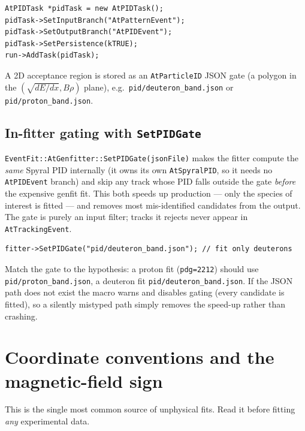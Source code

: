 \documentclass[11pt,a4paper]{article}
\newcommand{\code}[1]{\texttt{\small #1}}
\newcommand{\file}[1]{\texttt{\small #1}}
\begin{document}
\begin{lstlisting}
AtPIDTask *pidTask = new AtPIDTask();
pidTask->SetInputBranch("AtPatternEvent");
pidTask->SetOutputBranch("AtPIDEvent");
pidTask->SetPersistence(kTRUE);
run->AddTask(pidTask);
\end{lstlisting}

A 2D acceptance region is stored as an \code{AtParticleID} JSON gate (a polygon in
the $(\sqrt{dE/dx}, B\rho)$ plane), e.g.\ \file{pid/deuteron\_band.json} or
\file{pid/proton\_band.json}.

\subsection{In-fitter gating with \texttt{SetPIDGate}}

\code{EventFit::AtGenfitter::SetPIDGate(jsonFile)} makes the fitter compute the
\emph{same} Spyral PID internally (it owns its own \code{AtSpyralPID}, so it needs
no \code{AtPIDEvent} branch) and skip any track whose PID falls outside the gate
\emph{before} the expensive genfit fit. This both speeds up production --- only
the species of interest is fitted --- and removes most mis-identified candidates
from the output. The gate is purely an input filter; tracks it rejects never
appear in \code{AtTrackingEvent}.

\begin{lstlisting}
fitter->SetPIDGate("pid/deuteron_band.json"); // fit only deuterons
\end{lstlisting}

\begin{notebox}
Match the gate to the hypothesis: a proton fit (\code{pdg=2212}) should use
\code{pid/proton\_band.json}, a deuteron fit \code{pid/deuteron\_band.json}. If the
JSON path does not exist the macro warns and disables gating (every candidate is
fitted), so a silently mistyped path simply removes the speed-up rather than
crashing.
\end{notebox}

\section{Coordinate conventions and the magnetic-field sign}\label{sec:conventions}

\begin{warnbox}
This is the single most common source of unphysical fits. Read it before fitting
\emph{any} experimental data.
\end{warnbox}
\end{document}

